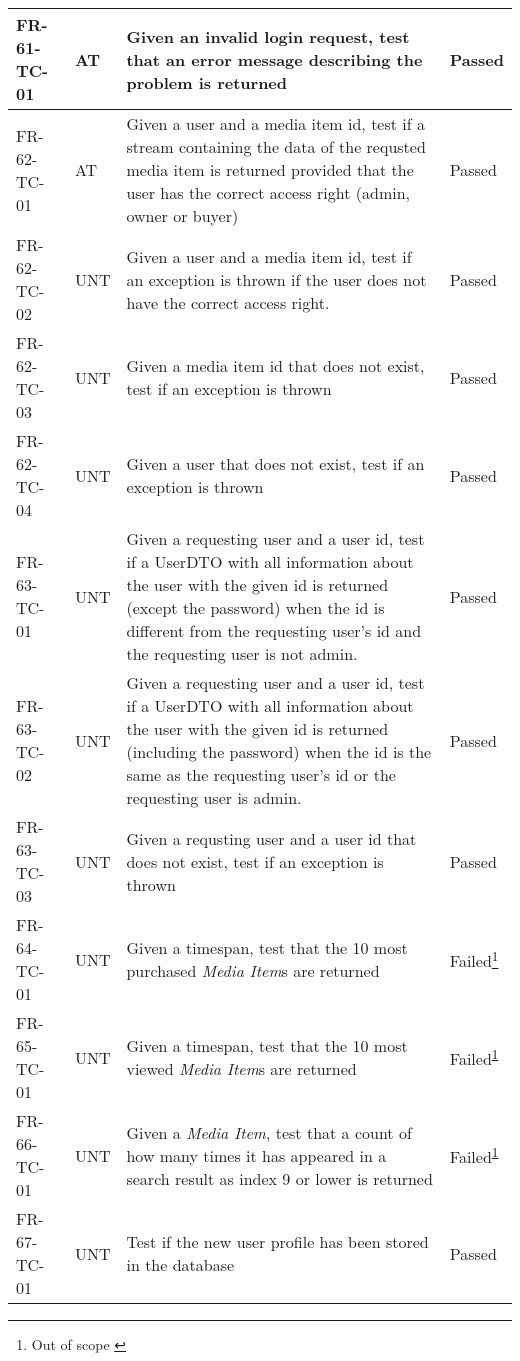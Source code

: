 \documentclass[../report.tex]{subfiles}
\newcommand{\footnoteref}[1]{\textsuperscript{\ref{#1}}}
\begin{document}
\begin{longtable}{|L{2.1cm}|L{0.8cm}|L{9cm}|L{1.2cm}|}
FR-61-TC-01&AT&Given an invalid login request, test that an error message describing the problem is returned&Passed  \\ \hline
FR-62-TC-01&AT&Given a user and a media item id, test if a stream containing the data of the requsted media item is returned provided that the user has the correct access right (admin, owner or buyer)&Passed  \\ \hline
FR-62-TC-02&UNT&Given a user and a media item id, test if an exception is thrown if the user does not have the correct access right.&Passed  \\ \hline
FR-62-TC-03&UNT&Given a media item id that does not exist, test if an exception is thrown&Passed  \\ \hline
FR-62-TC-04&UNT&Given a user that does not exist, test if an exception is thrown&Passed  \\ \hline
FR-63-TC-01&UNT&Given a requesting user and a user id, test if a UserDTO with all information about the user with the given id is returned (except the password) when the id is different from the requesting user's id and the requesting user is not admin.&Passed  \\ \hline
FR-63-TC-02&UNT&Given a requesting user and a user id, test if a UserDTO with all information about the user with the given id is returned (including the password) when the id is the same as the requesting user's id or the requesting user is admin.&Passed  \\ \hline
FR-63-TC-03&UNT&Given a requsting user and a user id that does not exist, test if an exception is thrown&Passed  \\ \hline
FR-64-TC-01 & UNT & Given a timespan, test that the 10 most purchased \textit{Media Item}s are returned & Failed\footnote{Out of scope \label{note2}}  \\ \hline
FR-65-TC-01 & UNT & Given a timespan, test that the 10 most viewed \textit{Media Item}s are returned & Failed\footnoteref{note2}  \\ \hline
FR-66-TC-01 & UNT & Given a \textit{Media Item}, test that a count of how many times it has appeared in a search result as index 9 or lower is returned & Failed\footnoteref{note2}  \\ \hline
FR-67-TC-01&UNT&Test if the new user profile has been stored in the database&Passed  \\ \hline

\end{longtable}
\end{document}
